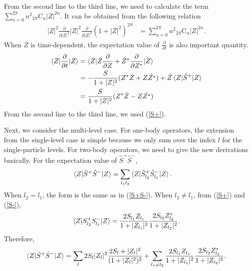 \documentclass[11pt]{book} %
\begin{document}
From the second line to the third line, we need to calculate the term $\sum_{n=0}^{2S}n^2{}_{2S}\mathrm{C}_n|Z|^{2n}$. It can be obtained from the following relation
\begin{align}
  |Z|^2\frac{\partial}{\partial |Z|^2}|Z|^2\frac{\partial}{\partial |Z|^2}
  (1+|Z|^2)^{2S} &= \sum_{n=0}^{2S}n^2{}_{2S}\mathrm{C}_n|Z|^{2n} .
\end{align}
When $Z$ is time-dependent, the expectation value of $\frac{\partial}{\partial t}$ is also important quantity.
\begin{align}
   \braket{Z|\frac{\partial}{\partial t}|Z} &= \braket{Z|\dot{Z}\frac{\partial}{\partial Z}+\dot{Z}^*\frac{\partial}{\partial Z^*}|Z} \nonumber \\
   &= -\frac{S}{1+|Z|^2}(Z^*\dot{Z}+Z\dot{Z^*}) + \dot{Z}\braket{Z|\hat{S}^+|Z} \nonumber \\
   &= \frac{S}{1+|Z|^2}(Z^*\dot{Z}-Z\dot{Z^*})
\end{align}
From the second line to the third line, we used (\ref{S+}).

Next, we consider the multi-level case. For one-body operators, the extension from the single-level case is simple because we only sum over the index $l$ for the single-particle levels. For two-body operators, we need to give the new derivations basically. For the expectation value of $\hat{S}^+\hat{S}^-$,
\begin{align}
  \braket{Z|\hat{S}^+\hat{S}^-|Z} &= \sum_{l_1l_2}\braket{Z|\hat{S}_{l_2}^+\hat{S}_{l_1}^-|Z} .
\end{align}
When $l_2=l_1$, the form is the same as in (\ref{S+S-}). When $l_2\ne l_1$, from (\ref{S+}) and (\ref{S-}),
\begin{align}
  \braket{Z|S_{l_2}^+S_{l_1}^-|Z} = \frac{2S_{l_1}Z_{l_1}}{1+|Z_{l_1}|^2}\frac{2S_{l_2}Z_{l_2}^*}{1+|Z_{l_2}|^2} .
\end{align}
Therefore,
\begin{align}
    \braket{Z|\hat{S}^+\hat{S}^-|Z} = \sum_l 2S_l|Z_l|^2\frac{2S_l+|Z_l|^2}{(1+|Z_l|^2)^2}
    + \sum_{l_1 \neq l_2} \frac{2S_{l_1}Z_{l_1}}{1+|Z_{l_1}|^2}\frac{2S_{l_2}Z_{l_2}^*}{1+|Z_{l_2}|^2} .
\end{align}
\end{document}
